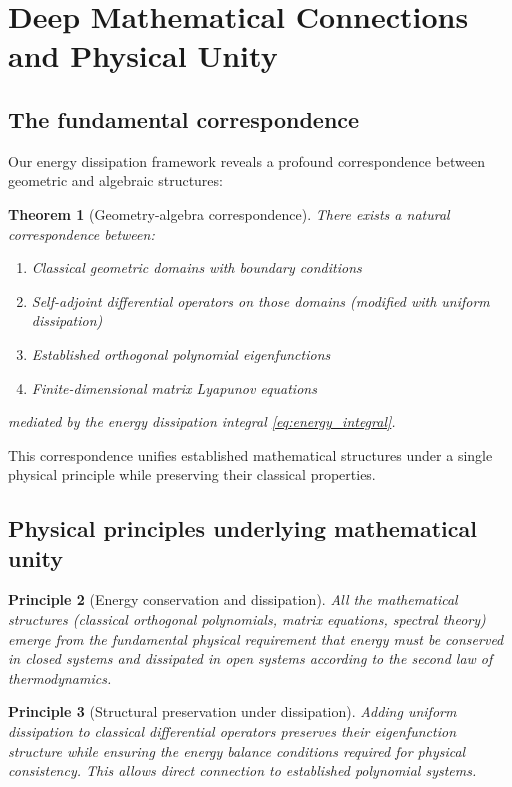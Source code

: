 \documentclass[a4paper,12pt]{article}
\newtheorem{theorem}{Theorem}[section]
\newtheorem{principle}[theorem]{Principle}
\begin{document}
\section{Deep Mathematical Connections and Physical Unity}\label{sec:unity}

\subsection{The fundamental correspondence}

Our energy dissipation framework reveals a profound correspondence between geometric and algebraic structures:

\begin{theorem}[Geometry-algebra correspondence]\label{thm:correspondence}
There exists a natural correspondence between:
\begin{enumerate}
\item Classical geometric domains with boundary conditions
\item Self-adjoint differential operators on those domains (modified with uniform dissipation)
\item Established orthogonal polynomial eigenfunctions
\item Finite-dimensional matrix Lyapunov equations
\end{enumerate}
mediated by the energy dissipation integral \eqref{eq:energy_integral}.
\end{theorem}

This correspondence unifies established mathematical structures under a single physical principle while preserving their classical properties.

\subsection{Physical principles underlying mathematical unity}

\begin{principle}[Energy conservation and dissipation]\label{prin:energy}
All the mathematical structures (classical orthogonal polynomials, matrix equations, spectral theory) emerge from the fundamental physical requirement that energy must be conserved in closed systems and dissipated in open systems according to the second law of thermodynamics.
\end{principle}

\begin{principle}[Structural preservation under dissipation]\label{prin:preservation}
Adding uniform dissipation to classical differential operators preserves their eigenfunction structure while ensuring the energy balance conditions required for physical consistency. This allows direct connection to established polynomial systems.
\end{principle}
\end{document}
